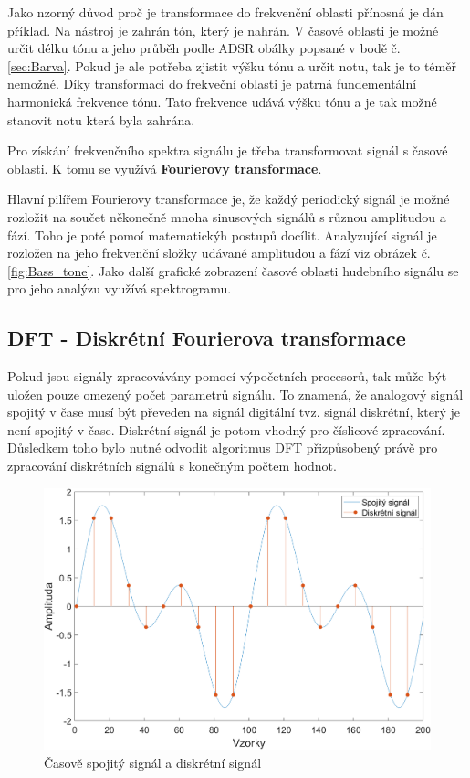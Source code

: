   Jako nzorný důvod proč je transformace do frekvenční oblasti přínosná je dán příklad. Na nástroj je zahrán tón, který je nahrán. 
  V časové oblasti je možné určit délku tónu a jeho průběh podle ADSR obálky popsané v bodě č. \ref*{sec:Barva}.
  Pokud je ale potřeba zjistit výšku tónu a určit notu, tak je to téměř nemožné.
  Díky transformaci do frekveční oblasti je patrná fundementální harmonická frekvence tónu.
  Tato frekvence udává výšku tónu a je tak možné stanovit notu která byla zahrána.

  Pro získání frekvenčního spektra signálu je třeba transformovat signál s časové oblasti.
  K tomu se využívá \textbf{Fourierovy transformace}. 

  Hlavní pilířem Fourierovy transformace je, že každý periodický signál je možné rozložit na součet někonečně mnoha sinusových signálů s různou amplitudou a fází.
  Toho je poté pomoí matematickýh postupů docílit.
  Analyzující signál je rozložen na jeho frekvenční složky udávané amplitudou a fází viz obrázek č.\ref*{fig:Bass_tone}.
  Jako další grafické zobrazení časové oblasti hudebního signálu se pro jeho analýzu využívá spektrogramu.


  \subsection{DFT - Diskrétní Fourierova transformace}

  Pokud jsou signály zpracovávány pomocí výpočetních procesorů,
  tak může být uložen pouze omezený počet parametrů signálu.
  To znamená, že analogový signál spojitý v čase musí být převeden na signál digitální tvz. signál diskrétní, který je není spojitý v čase. 
  Diskrétní signál je potom vhodný pro číslicové zpracování.
  Důsledkem toho bylo nutné odvodit algoritmus \acs{DFT} přizpůsobený právě pro zpracování diskrétních signálů s konečným počtem hodnot.

  \begin{figure}[H]
    \centering
    \includegraphics[width = 0.8\linewidth]{obrazky/Discrete_signal.png}
    \caption{Časově spojitý signál a diskrétní signál}
    \label{fig:Discrete_signal}
  \end{figure}

